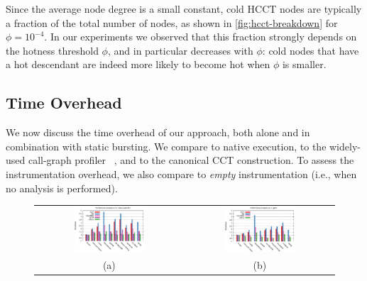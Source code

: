 Since the average node degree is a small constant, cold HCCT nodes are typically a fraction of the total number of nodes, as shown in \myfigure\ref{fig:hcct-breakdown} for $\phi=10^{-4}$. In our experiments we observed that this fraction strongly depends on the  hotness threshold $\phi$, and in particular decreases with $\phi$: cold nodes that have a hot descendant are indeed more likely to become hot when $\phi$ is smaller.

\subsection{Time Overhead}

We now discuss the time overhead of our approach, both alone and in combination with static bursting. We compare to native execution, to the widely-used call-graph profiler \gprof~\cite{Graham82}, and to the canonical CCT construction. To assess the instrumentation overhead, we also compare to {\em empty} instrumentation (i.e., when no analysis is performed).

\ifdefined\noauthorea
\begin{figure}[!ht]
\begin{center}
\begin{tabular}{cc}
\hspace{-6mm}
\includegraphics[width=0.49\textwidth]{figures/hcct-slowdown/hcct-slowdown-native.eps} &
\includegraphics[width=0.49\textwidth]{figures/hcct-slowdown/hcct-slowdown-gprof.eps}\\
(a) & (b)
\end{tabular}
\caption{\protect}
\end{center}
\end{figure}
\fi

